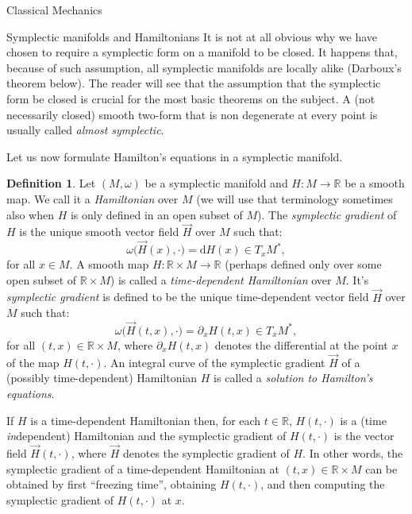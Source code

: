 \documentclass[oneside,a4paper,11pt]{amsbook}
\newcommand{\R}{\mathds R}
\newcommand{\dd}{\mathrm d}
\theoremstyle{remark}\newtheorem{exercise}{Exercise}[chapter]
\theoremstyle{plain}\newtheorem{teo}{Theorem}[section]
\theoremstyle{plain}\newtheorem{lem}[teo]{Lemma}
\theoremstyle{plain}\newtheorem{prop}[teo]{Proposition}
\theoremstyle{plain}\newtheorem{cor}[teo]{Corollary}
\theoremstyle{definition}\newtheorem{defin}[teo]{Definition}
\theoremstyle{remark}\newtheorem{rem}[teo]{Remark}
\theoremstyle{definition}\newtheorem{notation}[teo]{Notation}
\theoremstyle{definition}\newtheorem{convention}[teo]{Convention}
\theoremstyle{definition}\newtheorem{example}[teo]{Example}
\numberwithin{section}{chapter}
\numberwithin{equation}{section}
\begin{document}
\begin{chapter}{Classical Mechanics}
\begin{section}{Symplectic manifolds and Hamiltonians}
It is not at all obvious why we have chosen to require a symplectic form on a manifold to be closed. It happens that, because
of such assumption, all symplectic manifolds are locally alike (Darboux's theorem below). The reader will see that
the assumption that the symplectic form be closed is crucial for the most basic theorems on the subject.
A (not necessarily closed) smooth two-form that is non degenerate at every point is usually called {\em almost symplectic}.

Let us now formulate Hamilton's equations in a symplectic manifold.
\begin{defin}\label{thm:defsymplgrad}
Let $(M,\omega)$ be a symplectic manifold and $H:M\to\R$ be a smooth map. We call it a {\em Hamiltonian\/} over $M$
(we will use that terminology sometimes also when $H$ is only defined in an open subset of $M$). The
{\em symplectic gradient\/} of $H$ is the unique smooth vector field $\vec H$ over $M$ such that:
\[\omega\big(\vec H(x),\cdot\big)=\dd H(x)\in T_xM^*,\]
for all $x\in M$. A smooth map $H:\R\times M\to\R$ (perhaps defined only over some open subset of $\R\times M$)
is called a {\em time-dependent Hamiltonian\/} over $M$. It's {\em symplectic gradient\/} is defined to be the unique time-dependent
vector field $\vec H$ over $M$ such that:
\[\omega\big(\vec H(t,x),\cdot\big)=\partial_x H(t,x)\in T_xM^*,\]
for all $(t,x)\in\R\times M$, where $\partial_x H(t,x)$ denotes the differential at the point $x$ of the map
$H(t,\cdot)$. An integral curve of the symplectic gradient $\vec H$ of a (possibly time-dependent) Hamiltonian $H$
is called a {\em solution to Hamilton's equations}.
\end{defin}
If $H$ is a time-dependent Hamiltonian then, for each $t\in\R$, $H(t,\cdot)$ is a (time {\em in\/}dependent) Hamiltonian and the
symplectic gradient of $H(t,\cdot)$ is the vector field $\vec H(t,\cdot)$, where $\vec H$ denotes the symplectic gradient of $H$. In other words,
the symplectic gradient of a time-dependent Hamiltonian at $(t,x)\in\R\times M$ can be obtained by first ``freezing time'', obtaining
$H(t,\cdot)$, and then computing the symplectic gradient of $H(t,\cdot)$ at $x$.

\medskip


\end{section}
\end{chapter}
\end{document}

